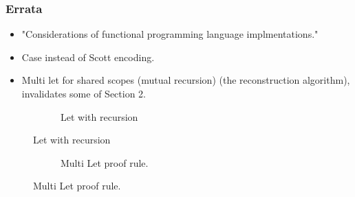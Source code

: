 \documentclass{beamer}
\begin{document}
\begin{frame}
\frametitle{Errata}
    \begin{itemize}
        \item "Considerations of functional programming language implmentations."
        \item Case instead of Scott encoding.
        \item Multi let for shared scopes (mutual recursion) (the reconstruction algorithm), invalidates some of Section 2.
    \end{itemize}
    \begin{figure}
        \begin{subfigure}[b]{1\textwidth}
        \begin{prooftree}
        \end{prooftree}
        \caption{Let with recursion}
        \end{subfigure}
    \end{figure}

    \begin{figure}
    \hspace*{-1.5cm}
    \begin{subfigure}[b]{1\textwidth}
    \begin{prooftree}
    \end{prooftree}
    \caption{Multi Let proof rule.}
    \end{subfigure}
    \end{figure}
\end{frame}
\end{document}
